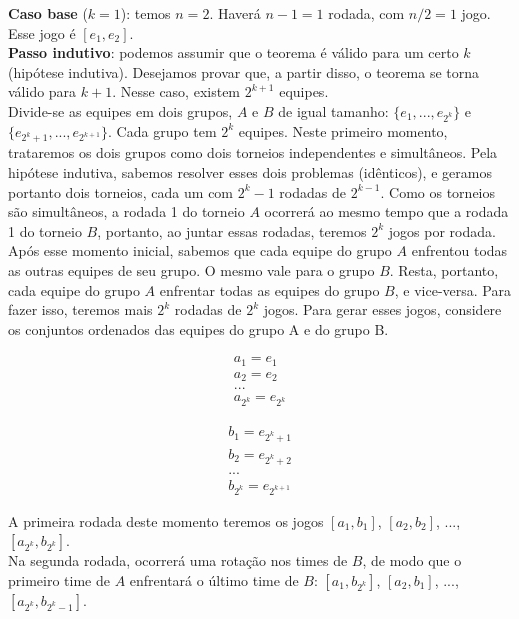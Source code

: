 \documentclass{article}
\begin{document}
\textbf{Caso base} ($k = 1$): temos $n = 2$. Haverá $n-1 = 1$ rodada, com $n/2 = 1$ jogo. Esse jogo é $[e_1, e_2]$.\\

\textbf{Passo indutivo}: podemos assumir que o teorema é válido para um certo $k$ (hipótese indutiva). Desejamos provar que, a partir disso, o teorema se torna válido para $k+1$. Nesse caso, existem $2^{k+1}$ equipes.\\

Divide-se as equipes em dois grupos, $A$ e $B$ de igual tamanho: $\{e_1, ..., e_{2^k}\}$ e $\{e_{2^k+1}, ..., e_{2^{k+1}}\}$. Cada grupo tem $2^k$ equipes. Neste primeiro momento, trataremos os dois grupos como dois torneios independentes e simultâneos. Pela hipótese indutiva, sabemos resolver esses dois problemas (idênticos), e geramos portanto dois torneios, cada um com $2^k - 1$ rodadas de $2^{k - 1}$. Como os torneios são simultâneos, a rodada 1 do torneio $A$ ocorrerá ao mesmo tempo que a rodada 1 do torneio $B$, portanto, ao juntar essas rodadas, teremos $2^k$ jogos por rodada.\\

Após esse momento inicial, sabemos que cada equipe do grupo $A$ enfrentou todas as outras equipes de seu grupo. O mesmo vale para o grupo $B$. Resta, portanto, cada equipe do grupo $A$ enfrentar todas as equipes do grupo $B$, e vice-versa. Para fazer isso, teremos mais $2^k$ rodadas de $2^k$ jogos. Para gerar esses jogos, considere os conjuntos ordenados das equipes do grupo A e do grupo B.

\begin{gather}
a_1 = e_1 \\
a_2 = e_2 \\
... \\
a_{2^k} = e_{2^k}\end{gather}

\begin{gather}
b_1 = e_{2^k + 1} \\
b_2 = e_{2^k + 2} \\
... \\
b_{2^k} = e_{2^{k+1}}\end{gather}

A primeira rodada deste momento teremos os jogos $[a_1, b_1]$, $[a_2, b_2]$, ..., $[a_{2^k}, b_{2^k}]$.\\

Na segunda rodada, ocorrerá uma rotação nos times de $B$, de modo que o primeiro time de $A$ enfrentará o último time de $B$: $[a_1, b_{2^k}]$, $[a_2, b_1]$, ..., $[a_{2^k}, b_{2^k-1}]$.\\
\end{document}
